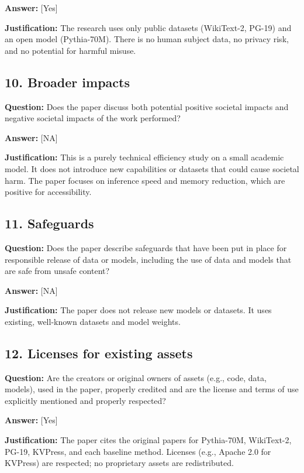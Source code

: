 \documentclass{article}
\begin{document}
\textbf{Answer:} [Yes]

\textbf{Justification:} The research uses only public datasets (WikiText-2, PG-19) and an open model (Pythia-70M). There is no human subject data, no privacy risk, and no potential for harmful misuse.

\subsection*{10. Broader impacts}

\textbf{Question:} Does the paper discuss both potential positive societal impacts and negative societal impacts of the work performed?

\textbf{Answer:} [NA]

\textbf{Justification:} This is a purely technical efficiency study on a small academic model. It does not introduce new capabilities or datasets that could cause societal harm. The paper focuses on inference speed and memory reduction, which are positive for accessibility.

\subsection*{11. Safeguards}

\textbf{Question:} Does the paper describe safeguards that have been put in place for responsible release of data or models, including the use of data and models that are safe from unsafe content?

\textbf{Answer:} [NA]

\textbf{Justification:} The paper does not release new models or datasets. It uses existing, well-known datasets and model weights.

\subsection*{12. Licenses for existing assets}

\textbf{Question:} Are the creators or original owners of assets (e.g., code, data, models), used in the paper, properly credited and are the license and terms of use explicitly mentioned and properly respected?

\textbf{Answer:} [Yes]

\textbf{Justification:} The paper cites the original papers for Pythia-70M, WikiText-2, PG-19, KVPress, and each baseline method. Licenses (e.g., Apache 2.0 for KVPress) are respected; no proprietary assets are redistributed.
\end{document}

